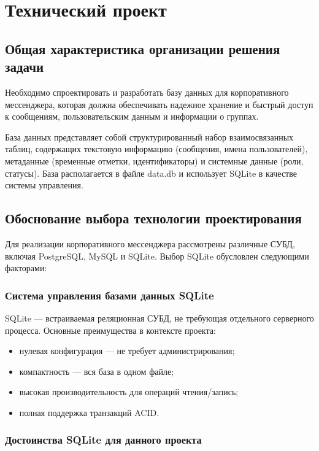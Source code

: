 \section{Технический проект}
\subsection{Общая характеристика организации решения задачи}

Необходимо спроектировать и разработать базу данных для корпоративного мессенджера, которая должна обеспечивать надежное хранение и быстрый доступ к сообщениям, пользовательским данным и информации о группах.

База данных представляет собой структурированный набор взаимосвязанных таблиц, содержащих текстовую информацию (сообщения, имена пользователей), метаданные (временные отметки, идентификаторы) и системные данные (роли, статусы). База располагается в файле data.db и использует SQLite в качестве системы управления.

\subsection{Обоснование выбора технологии проектирования}

Для реализации корпоративного мессенджера рассмотрены различные СУБД, включая PostgreSQL, MySQL и SQLite. Выбор SQLite обусловлен следующими факторами:

\subsubsection{Система управления базами данных SQLite}

SQLite — встраиваемая реляционная СУБД, не требующая отдельного серверного процесса. Основные преимущества в контексте проекта:

\begin{itemize}
	\item нулевая конфигурация — не требует администрирования;
	\item компактность — вся база в одном файле;
	\item высокая производительность для операций чтения/запись;
	\item полная поддержка транзакций ACID.
\end{itemize}

\subsubsection{Достоинства SQLite для данного проекта}

